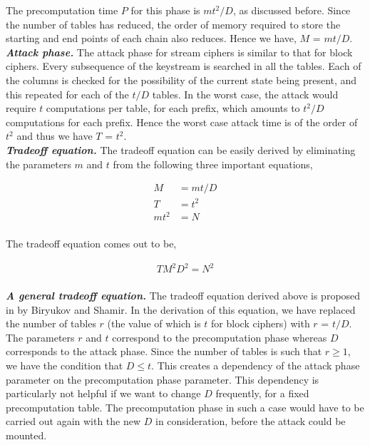 The precomputation time $P$ for this phase is $mt^2/D$, as discussed before. Since the number of tables has reduced, the order of memory required to store the starting and end points of each chain also reduces. Hence we have, $M$ = $mt/D$.\\

\noindent \textit{\textbf{Attack phase.}} The attack phase for stream ciphers is similar to that for block ciphers. Every subsequence of the keystream is searched in all the tables. Each of the columns is checked for the possibility of the current state being present, and this repeated for each of the $t/D$ tables. In the worst case, the attack would require $t$ computations per table, for each prefix, which amounts to $t^2/D$ computations for each prefix. Hence the worst case attack time is of the order of $t^2$ and thus we have $T$ = $t^2$.\\

\noindent \textit{\textbf{Tradeoff equation.}} The tradeoff equation can be easily derived by eliminating the parameters $m$ and $t$ from the following three important equations,

\begin{align*}
M &= mt/D\\
T &= t^2\\
mt^2 &= N\\
\end{align*}

The tradeoff equation comes out to be,

\begin{align}
\label{eq:tmdto-hellman-stream} TM^2D^2 = N^2
\end{align}
  \\
\noindent \textit{\textbf{A general tradeoff equation.}} The tradeoff equation derived above is proposed in \cite{biryukov2000ctm} by Biryukov and Shamir. In the derivation of this equation, we have replaced the number of tables $r$ (the value of which is $t$ for block ciphers) with $r$ = $t/D$. The parameters $r$ and $t$ correspond to the precomputation phase whereas $D$ corresponds to the attack phase. Since the number of tables is such that $r \geq 1$, we have the condition that $D \leq t$. This creates a dependency of the attack phase parameter on the precomputation phase parameter. This dependency is particularly not helpful if we want to change $D$ frequently, for a fixed precomputation table. The precomputation phase in such a case would have to be carried out again with the new $D$ in consideration, before the attack could be mounted. 

